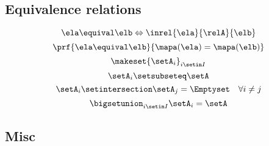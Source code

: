 {\begin{forslides}
        \subsection{Equivalence relations}

        \begin{equation}
            \label{eq:slides_session2_rel_158}
            \ela\equival \elb \Leftrightarrow \inrel{\ela}{\relA}{\elb}
        \end{equation}
        \begin{equation}
            \label{eq:slides_session2_rel_159}
            \prf{
                \ela\equival \elb
            }{
                \mapa(\ela)=\mapa(\elb)
            }
        \end{equation}
        \begin{equation}
            \label{eq:slides_session2_rel_160}
            \makeset{\setA_i}_{i\setin I}
        \end{equation}
        \begin{equation}
            \label{eq:slides_session2_rel_161}
            \setA_i\setsubseteq \setA
        \end{equation}
        \begin{equation}
            \label{eq:slides_session2_rel_162}
            \setA_i\setintersection \setA_j=\Emptyset \quad \forall i\neq j
        \end{equation}
        \begin{equation}
            \label{eq:slides_session2_rel_163}
            \bigsetunion_{i\setin I}\setA_i=\setA
        \end{equation}

        \subsection{Misc}



\end{forslides}}
